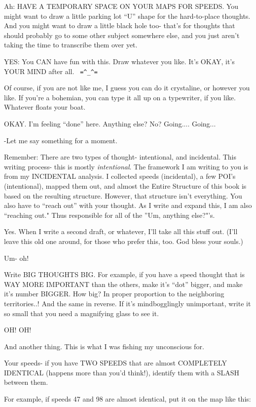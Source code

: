 \documentclass[oneside]{book}
\begin{document}
Ah: HAVE A TEMPORARY SPACE ON YOUR MAPS FOR SPEEDS. You might want to
draw a little parking lot ``U'' shape for the hard-to-place
thoughts. And you might want to draw a little black hole too- that's
for thoughts that should probably go to some other subject somewhere
else, and you just aren't taking the time to transcribe them over
yet.

YES: You CAN have fun with this. Draw whatever you like. It's OKAY,
it's YOUR MIND after all. \verb| =^_^= |

Of course, if you are not like me, I guess you can do it crystaline,
or however you like. If you're a bohemian, you can type it all up on a
typewriter, if you like. Whatever floats your boat.

OKAY. I'm feeling ``done'' here. Anything else? No? Going.... Going...

-Let me say something for a moment.

Remember: There are two types of thought- intentional, and
incidental. This writing process- this is mostly \emph{intentional}. The
framework I am writing to you is from my INCIDENTAL analysis. I
collected speeds (incidental), a few POI's (intentional), mapped them
out, and almost the Entire Structure of this book is based on the
resulting structure. However, that structure isn't everything. You
also have to ``reach out'' with your thought. As I write and expand
this, I am also ``reaching out." Thus responsible for all of the ''Um,
anything else?"'s.

Yes. When I write a second draft, or whatever, I'll take all this
stuff out. (I'll leave this old one around, for those who prefer this,
too. God bless your souls.)

Um- oh!

Write BIG THOUGHTS BIG. For example, if you have a speed thought that
is WAY MORE IMPORTANT than the others, make it's ``dot'' bigger, and
make it's number BIGGER. How big? In proper proportion to the
neighboring territories..! And the same in reverse. If it's
mindbogglingly unimportant, write it so small that you need a
magnifying glass to see it.

OH! OH!

And another thing.
This is what I was fishing my unconscious for.

Your speeds- if you have TWO SPEEDS that are almost COMPLETELY
IDENTICAL (happens more than you'd think!), identify them with a SLASH
between them.

For example, if speeds 47 and 98 are almost identical, put it on the map
like this:
\end{document}
